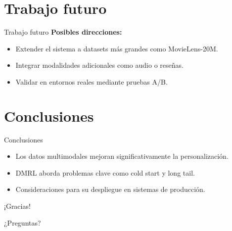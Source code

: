\documentclass{beamer}
\begin{document}
\section{Trabajo futuro}
\begin{frame}{Trabajo futuro}
    \textbf{Posibles direcciones:}
    \begin{itemize}
        \item Extender el sistema a datasets más grandes como MovieLens-20M.
        \item Integrar modalidades adicionales como audio o reseñas.
        \item Validar en entornos reales mediante pruebas A/B.
    \end{itemize}
\end{frame}

\section{Conclusiones}
\begin{frame}{Conclusiones}
    \begin{itemize}
        \item Los datos multimodales mejoran significativamente la personalización.
        \item DMRL aborda problemas clave como cold start y long tail.
        \item Consideraciones para su despliegue en sistemas de producción.
    \end{itemize}
\end{frame}

\begin{frame}{¡Gracias!}
    \begin{center}
        ¿Preguntas?
    \end{center}
\end{frame}
\end{document}
